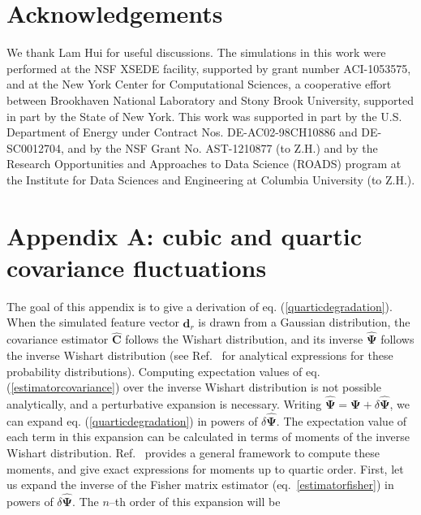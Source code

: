 \documentclass[reprint,aps,prd,superscriptaddress,showkeys,showpacs]{revtex4-1}
\newcommand{\bb}[1]{\mathbf{#1}}
\newcommand{\bbh}[1]{\mathbf{\hat{#1}}}
\begin{document}
 

\section*{Acknowledgements}
We thank Lam Hui for useful discussions.  The simulations in this work
were performed at the NSF XSEDE facility, supported by grant number
ACI-1053575, and at the New York Center for Computational Sciences, a
cooperative effort between Brookhaven National Laboratory and Stony
Brook University, supported in part by the State of New York. This
work was supported in part by the U.S. Department of Energy under
Contract Nos. DE-AC02-98CH10886 and DE-SC0012704, and by the NSF Grant
No. AST-1210877 (to Z.H.) and by the Research Opportunities and
Approaches to Data Science (ROADS) program at the Institute for Data
Sciences and Engineering at Columbia University (to Z.H.).  



%     
\section*{Appendix A: cubic and quartic covariance fluctuations}
\label{appendixA}

The goal of this appendix is to give a derivation of
eq. (\ref{quarticdegradation}). When the simulated feature vector
$\bbh{d}_r$ is drawn from a Gaussian distribution, the covariance
estimator $\bbh{C}$ follows the Wishart distribution, and its inverse
$\bbh{\Psi}$ follows the inverse Wishart distribution (see
Ref.~\citep{Taylor12} for analytical expressions for these probability
distributions). Computing expectation values of
eq. (\ref{estimatorcovariance}) over the inverse Wishart distribution
is not possible analytically, and a perturbative expansion is
necessary. Writing $\bbh{\Psi}=\bb{\Psi}+\delta\bbh{\Psi}$, we can
expand eq. (\ref{quarticdegradation}) 
in powers of $\delta\bbh{\Psi}$. The expectation value of each term in
this expansion can be calculated in terms of moments of the inverse
Wishart distribution. Ref.~\citep{MasumotoWishart} provides a general
framework to compute these moments, and give exact expressions for
moments up to quartic order. First, let us expand the inverse of the
Fisher matrix estimator (eq.~\ref{estimatorfisher}) in powers of
$\delta\bbh{\Psi}$. The $n$--th order of this expansion will be
\end{document}
